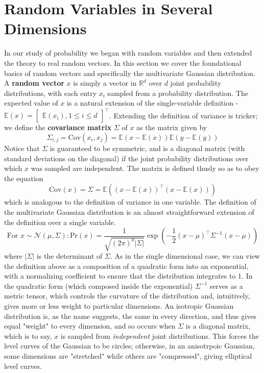 \documentclass{article}
\begin{document}
\section{Random Variables in Several Dimensions}
In our study of probability we began with random variables and then extended the theory to real random vectors. In this section we cover the foundational basics of random vectors and specifically the multivariate Gaussian distribution. A \textbf{random vector} $ x $ is simply a vector in $ \mathbb{R}^d $ over $ d $ joint probability distributions, with each entry $ x_i $ sampled from a probability distribution. The expected value of $ x $ is a natural extension of the single-variable definition - $ \mathbb{E}(x) = \begin{bmatrix} \mathbb{E}(x_i), 1 \leq i \leq d \end{bmatrix}^\intercal $. Extending the definition of variance is tricker; we define the \textbf{covariance matrix} $ \Sigma $ of $ x $ as the matrix given by
$$ \Sigma_{i, j} = \text{Cov}(x_i, x_j) = \mathbb{E}(x - \mathbb{E}(x))  \mathbb{E}(y - \mathbb{E}(y)) $$
Notice that $ \Sigma $ is guaranteed to be symmetric, and is a diagonal matrix (with standard deviations on the diagonal) if the joint probability distributions over which $ x $ was sampled are independent. The matrix is defined thusly so as to obey the equation
$$ \text{Cov}(x) = \Sigma = \mathbb{E}((x - \mathbb{E}(x))^\intercal (x - \mathbb{E}(x))) $$
which is analogous to the definition of variance in one variable. The definition of the multivariate Gaussian distribution is an almost straightforward extension of the definition over a single variable.
$$ \text{For } x \sim \mathcal{N}(\mu, \Sigma): \text{Pr}(x) = \frac{1}{\sqrt{(2 \pi)^d | \Sigma |}} \exp \left( - \frac{1}{2} (x - \mu)^\intercal \Sigma^{-1} (x - \mu) \right) $$
where $ | \Sigma | $ is the determinant of $ \Sigma $. As in the single dimensional case, we can view the definition above as a composition of a quadratic form into an exponential, with a normalizing coefficient to ensure that the distribution integrates to 1. In the quadratic form (which composed inside the exponential) $ \Sigma^{-1} $ serves as a metric tensor, which controls the curvature of the distribution and, intuitively, gives more or less weight to particular dimensions. An isotropic Guassian distribution is, as the name suggests, the same in every direction, and thus gives equal "weight" to every dimension, and so occurs when $ \Sigma $ is a diagonal matrix, which is to say, $ x $ is sampled from \textit{independent} joint distributions. This forces the level curves of the Gaussian to be circles; otherwise, in an anisotrpoic Gaussian, some dimensions are "stretched" while others are "compressed", giving elliptical level curves.
\end{document}
